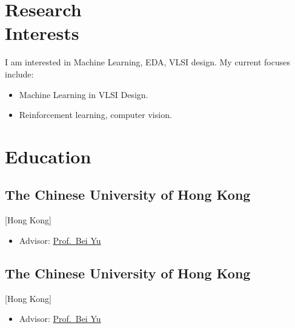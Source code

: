 \documentclass{mycv}
\begin{document}
\maketitle%

\section{Research \\ Interests}

I am interested in Machine Learning, EDA, VLSI design. My current focuses include:

\begin{itemize}
  \item Machine Learning in VLSI Design.
  \item Reinforcement learning, computer vision.
\end{itemize}



\section{Education}

\subsection{The Chinese University of Hong Kong}[Hong Kong]
\begin{positions}
\end{positions}
\vspace{-\parskip}%
\begin{itemize}
  \item Advisor: \href{http://www.cse.cuhk.edu.hk/~byu/}{Prof.~Bei Yu}
\end{itemize}

\subsection{The Chinese University of Hong Kong}[Hong Kong]
\begin{positions}
\end{positions}
\vspace{-\parskip}%
\begin{itemize}
  \item Advisor: \href{http://www.cse.cuhk.edu.hk/~byu/}{Prof.~Bei Yu}
\end{itemize}
\end{document}
